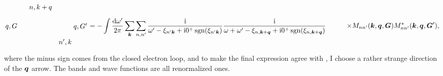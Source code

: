 \documentclass[hyperref, a4paper, 12pt]{report}
\DeclareMathOperator{\sgn}{sgn}
\newcommand*{\ii}{\mathrm{i}}
\def\\{}%
\begin{document}
\begin{equation}
\begin{aligned}
\begin{gathered}
\begin{tikzpicture}[x=0.75pt,y=0.75pt,yscale=-1,xscale=1]
                \draw (35.5,59) node [anchor=east] [inner sep=0.75pt]    {$q,G$};
                \draw (141.52,59) node [anchor=west] [inner sep=0.75pt]    {$q,G'$};
                \draw (113,82) node [anchor=north west][inner sep=0.75pt]    {$n',k$};
                \draw (56,15) node [anchor=north west][inner sep=0.75pt]    {$n,k+q$};
                
                
                \end{tikzpicture}            
        \end{gathered} \\
        &= - \int \frac{\dd{\omega'}}{2\pi} \sum_{\vb*{k}} \sum_{n, n'}
        \frac{\ii}{\omega' - \xi_{n' \vb*{k}} + \ii 0^+ \sgn(\xi_{n' \vb*{k}})} 
        \frac{\ii}{\omega + \omega' - \xi_{n, \vb*{k} + \vb*{q}} + \ii 0^+ \sgn(\xi_{n, \vb*{k} + \vb*{q}})} \\
        &\quad \quad \times M_{n n' } (\vb*{k}, \vb*{q}, \vb*{G}) M_{nn'}^* (\vb*{k}, \vb*{q}, \vb*{G}') ,
    \end{aligned}
\end{equation}
where the minus sign comes from the closed electron loop,
and to make the final expression agree with \cite{berkeleygw},
I choose a rather strange direction of the $\vb*{q}$ arrow.
The bands and wave functions are all renormalized ones.
\end{document}
